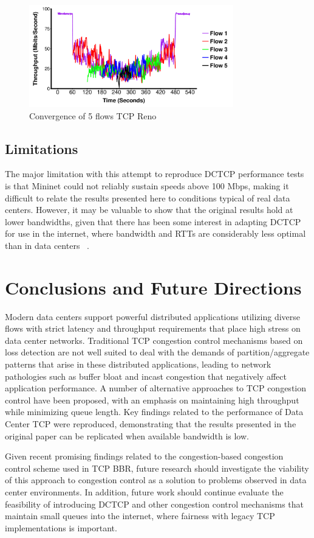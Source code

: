\begin{figure}
\includegraphics[height=1.75in,width=3.5in]{reno_converg}
\caption{Convergence of 5 flows TCP Reno}
\end{figure}

\subsection{Limitations}

The major limitation with this attempt to reproduce DCTCP performance tests is that Mininet could not reliably sustain speeds above 100 Mbps, making it difficult to relate the results presented here to conditions typical of real data centers. However, it may be valuable to show that the original results hold at lower bandwidths, given that there has been some interest in adapting DCTCP for use in the internet, where bandwidth and RTTs are considerably less optimal than in data centers ~\cite{kuhlewind_using_2014}.

\section{Conclusions and Future Directions}

Modern data centers support powerful distributed applications utilizing diverse flows with strict latency and throughput requirements that place high stress on data center networks. Traditional TCP congestion control mechanisms based on loss detection are not well suited to deal with the demands of partition/aggregate patterns that arise in these distributed applications, leading to network pathologies such as buffer bloat and incast congestion that negatively affect application performance. A number of alternative approaches to TCP congestion control have been proposed, with an emphasis on maintaining high throughput while minimizing queue length. Key findings related to the performance of Data Center TCP were reproduced, demonstrating that the results presented in the original paper can be replicated when available bandwidth is low. 

Given recent promising findings related to the congestion-based congestion control scheme used in TCP BBR, future research should investigate the viability of this approach to congestion control as a solution to problems observed in data center environments. In addition, future work should continue evaluate the feasibility of introducing DCTCP and other congestion control mechanisms that maintain small queues into the internet, where fairness with legacy TCP implementations is important. 
